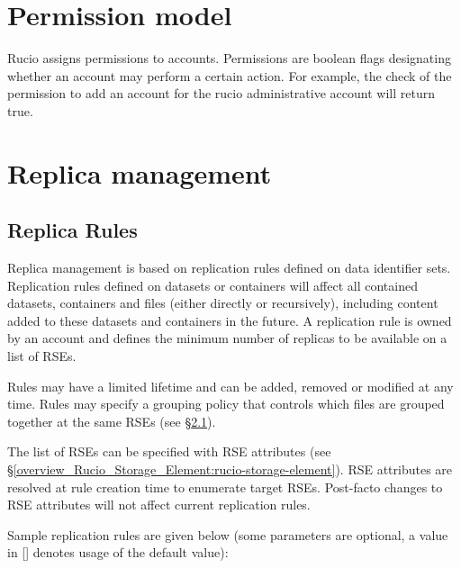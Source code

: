 \documentclass{atlasnote}
\begin{document}
\section{Permission model}
\label{overview_Permission_model:permission-model}

Rucio assigns permissions to accounts. Permissions are boolean flags designating whether an account may perform a certain action. For example, the check of the permission to add an account for the rucio administrative account will return true.

\section{Replica management}
\label{overview_Replica_management:replica-management}

\subsection{Replica Rules}
\label{sec:replica-rules}

Replica management is based on replication rules defined on data identifier sets. Replication rules defined on datasets or containers will affect all contained datasets, containers and files (either directly or recursively), including content added to these datasets and containers in the future. A replication rule is owned by an account and defines the minimum number of replicas to be available on a list of RSEs.

Rules may have a limited lifetime and can be added, removed or modified at any time. Rules may specify a grouping policy that controls which files are grouped together at the same RSEs (see \S \ref{sec:replica-rules}).

The list of RSEs can be specified with RSE attributes (see \S \ref{overview_Rucio_Storage_Element:rucio-storage-element}). RSE attributes are resolved at rule creation time to enumerate target RSEs. Post-facto changes to RSE attributes will not affect current replication rules.

Sample replication rules are given below (some parameters are optional, a value in [] denotes usage of the default value):
\end{document}
